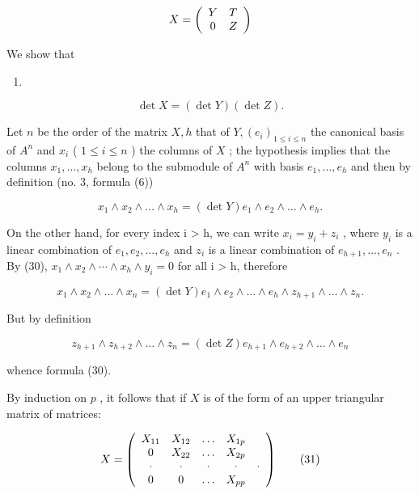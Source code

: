 \[
X = \left( \begin{array}{c c} Y & T \\ 0 & Z \end{array} \right)
\]

We show that

\begin{enumerate}
\def\labelenumi{(\arabic{enumi})}
\setcounter{enumi}{29}
\tightlist
\item
\end{enumerate}

\[
\det X = (\det Y) (\det Z).
\]

Let \(n\) be the order of the matrix \(X, h\) that of \(Y, (e_i)_{1 \leqslant i \leqslant n}\) the canonical basis of \(A^n\) and \(x_i\) ( \(1 \leqslant i \leqslant n\) ) the columns of \(X\) ; the hypothesis implies that the columns \(x_1, \ldots, x_h\) belong to the submodule of \(A^n\) with basis \(e_1, \ldots, e_h\) and then by definition (no. 3, formula (6))

\[
x _ {1} \wedge x _ {2} \wedge \dots \wedge x _ {h} = (\det Y) e _ {1} \wedge e _ {2} \wedge \dots \wedge e _ {h}.
\]

On the other hand, for every index i \textgreater{} h, we can write \(x_{i} = y_{i} + z_{i}\) , where \(y_{i}\) is a linear combination of \(e_{1}, e_{2}, \ldots, e_{h}\) and \(z_{i}\) is a linear combination of \(e_{h+1}, \ldots, e_{n}\) . By (30), \(x_{1} \wedge x_{2} \wedge \cdots \wedge x_{h} \wedge y_{i} = 0\) for all i \textgreater{} h, therefore

\[
x _ {1} \wedge x _ {2} \wedge \dots \wedge x _ {n} = (\det Y) e _ {1} \wedge e _ {2} \wedge \dots \wedge e _ {h} \wedge z _ {h + 1} \wedge \dots \wedge z _ {n}.
\]

But by definition

\[
z _ {h + 1} \wedge z _ {h + 2} \wedge \dots \wedge z _ {n} = (\det Z) e _ {h + 1} \wedge e _ {h + 2} \wedge \dots \wedge e _ {n}
\]

whence formula (30).

By induction on \(p\) , it follows that if \(X\) is of the form of an upper triangular matrix of matrices:

\[
X = \left( \begin{array}{c c c c c} X _ {1 1} & X _ {1 2} & \ldots & X _ {1 p} \\ 0 & X _ {2 2} & \ldots & X _ {2 p} \\ \cdot & \cdot & \cdot & \cdot & \cdot \\ 0 & 0 & \ldots & X _ {p p} \end{array} \right)\tag{31}
\]

